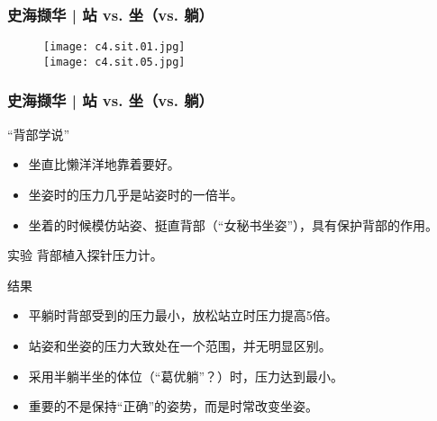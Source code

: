 \begin{frame}
  \frametitle{史海撷华 | 站 vs. 坐（vs. 躺）}
  \begin{figure}
    \centering
    \texttt{[image: c4.sit.01.jpg]}\\
    \texttt{[image: c4.sit.05.jpg]}
  \end{figure}
\end{frame}

\begin{frame}
  \frametitle{史海撷华 | 站 vs. 坐（vs. 躺）}
  \begin{block}{“背部学说”}
    \begin{itemize}
      \item 坐直比懒洋洋地靠着要好。
      \item 坐姿时的压力几乎是站姿时的一倍半。
      \item 坐着的时候模仿站姿、挺直背部（“女秘书坐姿”），具有保护背部的作用。
    \end{itemize}
  \end{block}
  \vspace{-0.5em}
  \pause
  \begin{block}{实验}
    背部植入探针压力计。
  \end{block}
  \vspace{-0.5em}
  \pause
  \begin{block}{结果}
    \begin{itemize}
      \item 平躺时背部受到的压力最小，放松站立时压力提高5倍。
      \item 站姿和坐姿的压力大致处在一个范围，并无明显区别。
      \item 采用半躺半坐的体位（“葛优躺”？）时，压力达到最小。
      \item 重要的不是保持“正确”的姿势，而是时常改变坐姿。
    \end{itemize}
  \end{block}
\end{frame}

